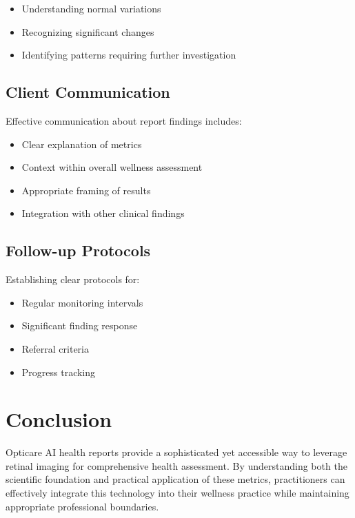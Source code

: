 \documentclass[
  Letterpaper,
]{scrbook}
\providecommand{\tightlist}{%
  \setlength{\itemsep}{0pt}\setlength{\parskip}{0pt}}\usepackage{longtable,booktabs,array}
\begin{document}
\begin{itemize}
\tightlist
\item
  Understanding normal variations
\item
  Recognizing significant changes
\item
  Identifying patterns requiring further investigation
\end{itemize}

\subsection{Client Communication}\label{client-communication}

Effective communication about report findings includes:

\begin{itemize}
\tightlist
\item
  Clear explanation of metrics
\item
  Context within overall wellness assessment
\item
  Appropriate framing of results
\item
  Integration with other clinical findings
\end{itemize}

\subsection{Follow-up Protocols}\label{follow-up-protocols}

Establishing clear protocols for:

\begin{itemize}
\tightlist
\item
  Regular monitoring intervals
\item
  Significant finding response
\item
  Referral criteria
\item
  Progress tracking
\end{itemize}

\section{Conclusion}\label{conclusion}

Opticare AI health reports provide a sophisticated yet accessible way to
leverage retinal imaging for comprehensive health assessment. By
understanding both the scientific foundation and practical application
of these metrics, practitioners can effectively integrate this
technology into their wellness practice while maintaining appropriate
professional boundaries.
\end{document}
